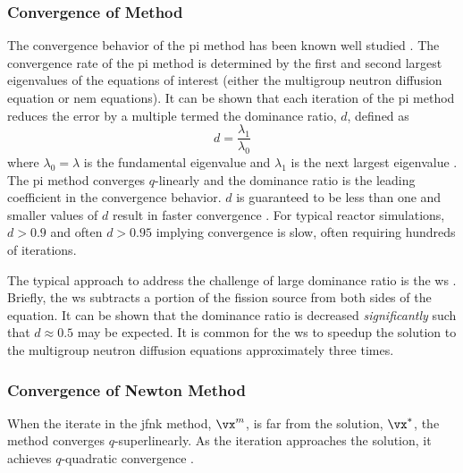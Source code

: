     \subsubsection{\texorpdfstring{Convergence of 
      Method}{Convergence of Power Iteration Method}}
      \label{sec:dominance_ratio}
      The convergence behavior of the \gls{pi} method has been known well
      studied \cite{nakamura,gehinThesis,my_ms_thesis}. The convergence rate of
      the \gls{pi} method is determined by the first and second largest
      eigenvalues of the equations of interest (either the multigroup neutron
      diffusion equation or \gls{nem} equations). It can be shown that each
      iteration of the \gls{pi} method reduces the error by a multiple termed
      the dominance ratio, $d$, defined as
      \begin{equation}
        \label{eq:dominance_ratio}
        d = \frac{\lambda_1}{\lambda_0}
      \end{equation}
      where $\lambda_0 = \lambda$ is the fundamental eigenvalue and $\lambda_1$
      is the next largest eigenvalue \cite{my_ms_thesis}. The \gls{pi} method
      converges $q$-linearly and the dominance ratio is the leading coefficient
      in the convergence behavior. $d$ is guaranteed to be less than one and
      smaller values of $d$ result in faster convergence \cite{nakamura}. For
      typical reactor simulations, $d > 0.9$ and often $d > 0.95$ implying
      convergence is slow, often requiring hundreds of iterations.

      The typical approach to address the challenge of large dominance ratio is
      the \gls{ws} \cite{gehinThesis}. Briefly, the \gls{ws} subtracts a portion
      of the fission source from both sides of the equation.  It can be shown
      that the dominance ratio is decreased \textit{significantly} such that $d
      \approx 0.5$ may be expected. It is common for the \gls{ws} to speedup 
      the solution to the multigroup neutron diffusion equations approximately
      three times.

    \subsubsection{Convergence of Newton Method}
      When the iterate in the \gls{jfnk} method, $\vx^m$, is far from the
      solution, $\vx^*$, the method converges $q$-superlinearly. As the
      iteration approaches the solution, it achieves $q$-quadratic convergence
      \cite{textbookkelley}.

